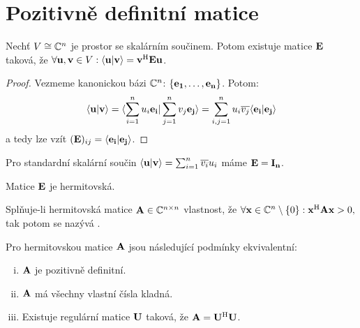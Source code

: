 \section{Pozitivně definitní matice}

\begin{observation}
    Nechť $V \cong \mathbb{C}^n$ je prostor se skalárním součinem. Potom
    existuje matice $\mathbf{E}$ taková, že $\forall \mathbf{u}, \mathbf{v} \in V:
    \langle \mathbf{u} | \mathbf{v} \rangle = \mathbf{v}^{\mathrm{H}} \mathbf{E} \mathbf{u}$.
\end{observation}

\begin{proof}
    Vezmeme kanonickou bázi $\mathbb{C}^n$: $\{\mathbf{e_1}, \dots, \mathbf{e_n}\}$. Potom:
    $$\langle \mathbf{u} | \mathbf{v} \rangle = \langle \sum_{i=1}^n u_i\mathbf{e_i} | \sum_{j=1}^n v_j\mathbf{e_j} \rangle = 
    \sum_{i,j=1}^n u_i\overline{v_j}\langle \mathbf{e_i} | \mathbf{e_j} \rangle$$
    a tedy lze vzít $(\mathbf{E})_{ij} = \langle \mathbf{e_i} | \mathbf{e_j} \rangle$.
\end{proof}

\begin{remark}
    Pro standardní skalární součin $\langle \mathbf{u} | \mathbf{v} \rangle = \sum_{i=1}^n 
    \overline{v_i}u_i$ máme $\mathbf{E} = \mathbf{I_{n}}$.
\end{remark}

\begin{observation}
    Matice $\mathbf{E}$ je hermitovská.
\end{observation}

\begin{definition}
    Splňuje-li hermitovská matice $\mathbf{A} \in \mathbb{C}^{n\times n}$ vlastnost, že
    $\forall \mathbf{x} \in \mathbb{C}^n \setminus \{0\}: \mathbf{x}^{\mathrm{H}}\mathbf{A}\mathbf{x} > 0,$ tak potom
    se nazývá .
\end{definition}

\begin{theorem}
    Pro hermitovskou matice $\mathbf{A}$ jsou následující podmínky ekvivalentní:
    \begin{enumerate}[i.]
        \item $\mathbf{A}$ je pozitivně definitní.
        \item $\mathbf{A}$ má všechny vlastní čísla kladná.
        \item Existuje regulární matice $\mathbf{U}$ taková, že $\mathbf{A} = \mathbf{U}^{\mathrm{H}}\mathbf{U}$.
    \end{enumerate}
\end{theorem}

